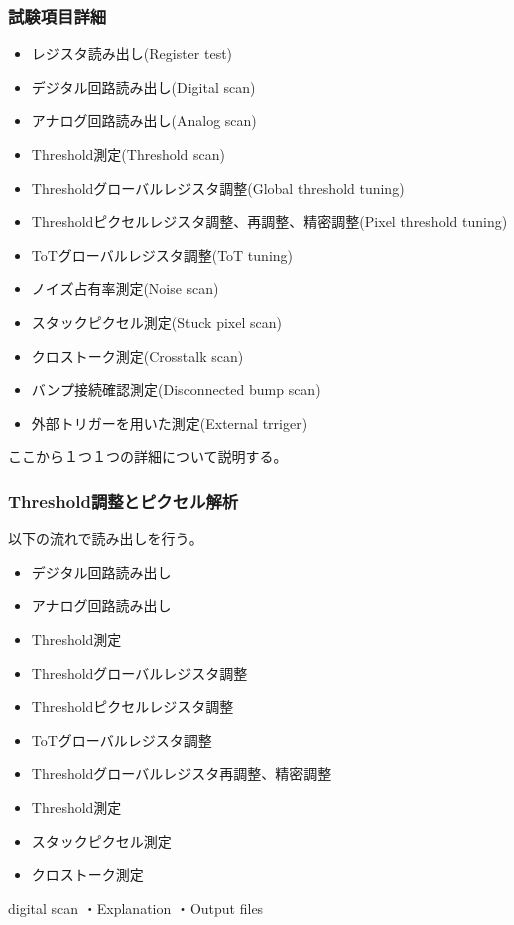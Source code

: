 \subsubsection{試験項目詳細}
\begin{itemize}
  \item レジスタ読み出し(Register test)
  \item デジタル回路読み出し(Digital scan)
  \item アナログ回路読み出し(Analog scan)
  \item Threshold測定(Threshold scan)
  \item Thresholdグローバルレジスタ調整(Global threshold tuning)
  \item Thresholdピクセルレジスタ調整、再調整、精密調整(Pixel threshold tuning)
  \item ToTグローバルレジスタ調整(ToT tuning)
  \item ノイズ占有率測定(Noise scan)
  \item スタックピクセル測定(Stuck pixel scan)
  \item クロストーク測定(Crosstalk scan)
  \item バンプ接続確認測定(Disconnected bump scan)
  \item 外部トリガーを用いた測定(External trriger)
\end{itemize}
ここから１つ１つの詳細について説明する。
  
\subsubsection{Threshold調整とピクセル解析}
以下の流れで読み出しを行う。
\begin{itemize}
  \item デジタル回路読み出し
  \item アナログ回路読み出し
  \item Threshold測定
  \item Thresholdグローバルレジスタ調整
  \item Thresholdピクセルレジスタ調整
  \item ToTグローバルレジスタ調整
  \item Thresholdグローバルレジスタ再調整、精密調整
  \item Threshold測定
  \item スタックピクセル測定
  \item クロストーク測定
\end{itemize}

digital scan
・Explanation
・Output files



